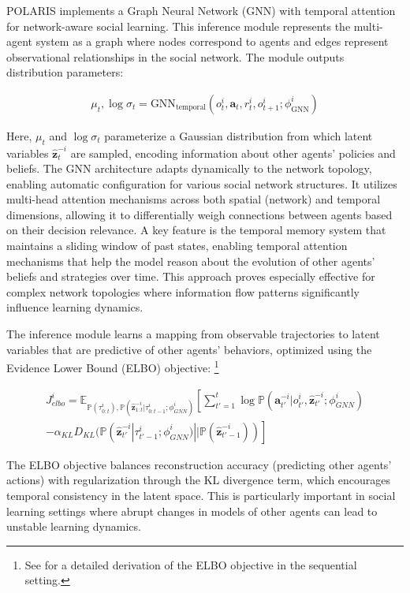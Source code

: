 POLARIS implements a Graph Neural Network (GNN) with temporal attention for network-aware social learning. This inference module represents the multi-agent system as a graph where nodes correspond to agents and edges represent observational relationships in the social network. The module outputs distribution parameters:

\begin{align}
    \mu_t, \log\sigma_t = \text{GNN}_{\text{temporal}}(o^i_t, \boldsymbol{a}_t, r^i_t, o^i_{t+1}; \phi^i_{\text{GNN}})
\end{align}

Here, $\mu_t$ and $\log\sigma_t$ parameterize a Gaussian distribution from which latent variables $\boldsymbol{\hat{z}}^{-i}_t$ are sampled, encoding information about other agents' policies and beliefs. The GNN architecture adapts dynamically to the network topology, enabling automatic configuration for various social network structures. It utilizes multi-head attention mechanisms across both spatial (network) and temporal dimensions, allowing it to differentially weigh connections between agents based on their decision relevance. A key feature is the temporal memory system that maintains a sliding window of past states, enabling temporal attention mechanisms that help the model reason about the evolution of other agents' beliefs and strategies over time. This approach proves especially effective for complex network topologies where information flow patterns significantly influence learning dynamics.

The inference module learns a mapping from observable trajectories to latent variables that are predictive of other agents' behaviors, optimized using the Evidence Lower Bound (ELBO) objective: \footnote{See \cite{kim2022influencing} for a detailed derivation of the ELBO objective in the sequential setting.}

\begin{align}
    J^i_{elbo} = \mathbb{E}_{\mathbb{P}(\tau^i_{0:t}),\mathbb{P}(\boldsymbol{\hat{z}}^{-i}_{1:t}|\tau^i_{0:t-1};\phi^i_{GNN})}\left[ \sum_{t'=1}^t \log \mathbb{P}(\boldsymbol{a}^{-i}_{t'}|o^i_{t'}, \boldsymbol{\hat{z}}^{-i}_{t'}; \phi^i_{GNN}) \right. \\
    \left. - \alpha_{KL} D_{KL}(\mathbb{P}(\boldsymbol{\hat{z}}^{-i}_{t'}|\tau^i_{t'-1}; \phi^i_{GNN})||\mathbb{P}(\boldsymbol{\hat{z}}^{-i}_{t'-1}))\right]
\end{align}

The ELBO objective balances reconstruction accuracy (predicting other agents' actions) with regularization through the KL divergence term, which encourages temporal consistency in the latent space. This is particularly important in social learning settings where abrupt changes in models of other agents can lead to unstable learning dynamics.

